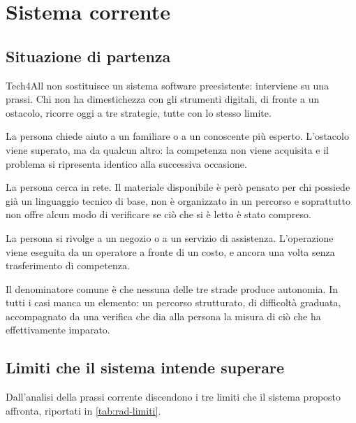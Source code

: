 \chapter{Sistema corrente}
\label{cap:rad-sistema-corrente}

\section{Situazione di partenza}

Tech4All non sostituisce un sistema software preesistente: interviene su una
prassi. Chi non ha dimestichezza con gli strumenti digitali, di fronte a un
ostacolo, ricorre oggi a tre strategie, tutte con lo stesso limite.

\begin{description}[leftmargin=1.6cm,style=nextline]
  \item[Delega] La persona chiede aiuto a un familiare o a un conoscente più
    esperto. L'ostacolo viene superato, ma da qualcun altro: la competenza non
    viene acquisita e il problema si ripresenta identico alla successiva
    occasione.
  \item[Ricerca autonoma] La persona cerca in rete. Il materiale disponibile
    è però pensato per chi possiede già un linguaggio tecnico di base, non è
    organizzato in un percorso e soprattutto non offre alcun modo di
    verificare se ciò che si è letto è stato compreso.
  \item[Ricorso a un servizio] La persona si rivolge a un negozio o a un
    servizio di assistenza. L'operazione viene eseguita da un operatore a
    fronte di un costo, e ancora una volta senza trasferimento di competenza.
\end{description}

Il denominatore comune è che nessuna delle tre strade produce autonomia. In
tutti i casi manca un elemento: un percorso strutturato, di difficoltà
graduata, accompagnato da una verifica che dia alla persona la misura di ciò
che ha effettivamente imparato.


\section{Limiti che il sistema intende superare}

Dall'analisi della prassi corrente discendono i tre limiti che il sistema
proposto affronta, riportati in \cref{tab:rad-limiti}.

